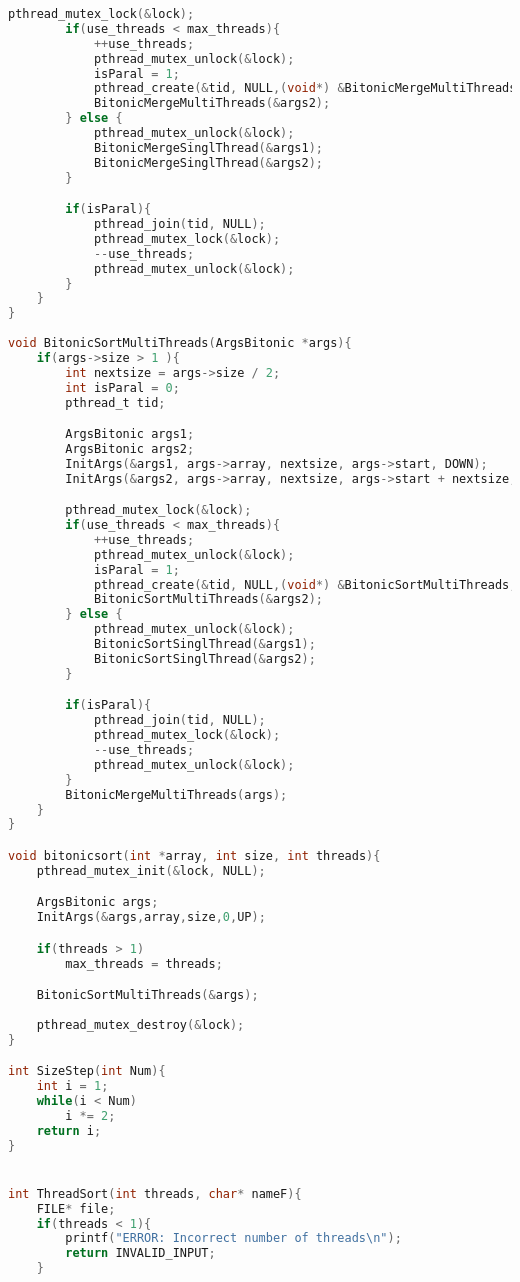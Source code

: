 \documentclass[pdf, unicode, 12pt, a4paper,oneside,fleqn]{article}
\begin{document}
\begin{lstlisting}[language=C]
        pthread_mutex_lock(&lock);
        if(use_threads < max_threads){ 
            ++use_threads;
            pthread_mutex_unlock(&lock);
            isParal = 1;
            pthread_create(&tid, NULL,(void*) &BitonicMergeMultiThreads, &args1);
            BitonicMergeMultiThreads(&args2);
        } else {
            pthread_mutex_unlock(&lock);
            BitonicMergeSinglThread(&args1);
            BitonicMergeSinglThread(&args2);
        }

        if(isParal){
            pthread_join(tid, NULL);
            pthread_mutex_lock(&lock);
            --use_threads;
            pthread_mutex_unlock(&lock);
        }
    }
}
 
void BitonicSortMultiThreads(ArgsBitonic *args){
    if(args->size > 1 ){
        int nextsize = args->size / 2;
        int isParal = 0;
        pthread_t tid;

        ArgsBitonic args1;
        ArgsBitonic args2;
        InitArgs(&args1, args->array, nextsize, args->start, DOWN);
        InitArgs(&args2, args->array, nextsize, args->start + nextsize, UP);

        pthread_mutex_lock(&lock);
        if(use_threads < max_threads){
            ++use_threads;
            pthread_mutex_unlock(&lock);
            isParal = 1;
            pthread_create(&tid, NULL,(void*) &BitonicSortMultiThreads, &args1);
            BitonicSortMultiThreads(&args2);
        } else {
            pthread_mutex_unlock(&lock);
            BitonicSortSinglThread(&args1);
            BitonicSortSinglThread(&args2);
        }

        if(isParal){
            pthread_join(tid, NULL);
            pthread_mutex_lock(&lock);
            --use_threads;
            pthread_mutex_unlock(&lock);
        }
        BitonicMergeMultiThreads(args);
    }
}

void bitonicsort(int *array, int size, int threads){
    pthread_mutex_init(&lock, NULL);

    ArgsBitonic args;
    InitArgs(&args,array,size,0,UP);

    if(threads > 1)
        max_threads = threads;

    BitonicSortMultiThreads(&args);
    
    pthread_mutex_destroy(&lock);
}

int SizeStep(int Num){
    int i = 1;
    while(i < Num)
        i *= 2;
    return i;
}


int ThreadSort(int threads, char* nameF){
    FILE* file;
    if(threads < 1){
        printf("ERROR: Incorrect number of threads\n");
        return INVALID_INPUT;
    }


\end{lstlisting}
\end{document}
